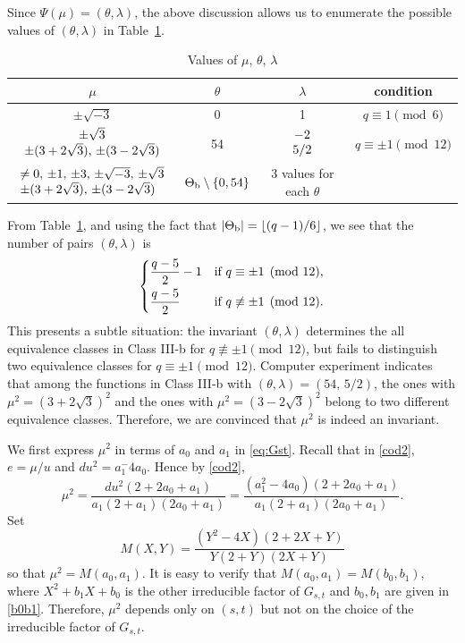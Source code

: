 \documentclass{amsart}
\numberwithin{equation}{section}
\theoremstyle{definition}
\begin{document}
Since $\Psi(\mu)=(\theta,\lambda)$, the above discussion allows us to enumerate the possible values of $(\theta,\lambda)$ in Table~\ref{tb:the-lam}.

\begin{table}[ht]
\caption{Values of $\mu$, $\theta$, $\lambda$}\label{tb:the-lam}
   \renewcommand*{\arraystretch}{1.4}
    \centering
     \begin{tabular}{c|c|c|c}
         \hline
         $\mu$ & $\theta$ & $\lambda$  & condition \\ \hline
         $\pm\sqrt{-3}$ & 0 & 1& $q\equiv 1\pmod 6$ \\ \hline
         $\begin{array}{c} \pm \sqrt3 \cr \pm(3+2\sqrt3),\, \pm(3-2\sqrt3)\end{array}$ & 54 & $\begin{array}{c} -2 \cr 5/2\end{array}$ & $q\equiv \pm1\pmod{12}$\\ \hline
         $\begin{array}{l} \ne0,\,\pm1,\,\pm3,\, \pm\sqrt{-3},\,\pm\sqrt 3\cr \pm(3+2\sqrt3),\, \pm(3-2\sqrt3)\end{array}$ & $\Theta_{\rm b}\setminus\{0,54\}$  &  3 values for each $\theta$  \\ \hline
     \end{tabular}
\end{table}

From Table~\ref{tb:the-lam}, and using the fact that $|\Theta_{\rm b}|=\lfloor(q-1)/6\rfloor$, we see that the number of pairs $(\theta,\lambda)$ is 
\[
\begin{cases}
\displaystyle\frac{q-5}2-1&\text{if}\ q\equiv\pm1\pmod{12},\vspace{0.4em}\cr
\displaystyle\frac{q-5}2&\text{if}\ q\not\equiv\pm1\pmod{12}.
\end{cases}
\]
This presents a subtle situation: the invariant $(\theta,\lambda)$ determines the all equivalence classes in Class III-b for $q\not\equiv\pm1\pmod{12}$, but fails to distinguish two equivalence classes for $q\equiv\pm1\pmod{12}$. Computer experiment indicates that among the functions in Class III-b with $(\theta,\lambda)=(54,\,5/2)$, the ones with $\mu^2=(3+2\sqrt3)^2$ and the ones with $\mu^2=(3-2\sqrt3)^2$ belong to two different equivalence classes. Therefore, we are convinced that $\mu^2$ is indeed an invariant.

We first express $\mu^2$ in terms of $a_0$ and $a_1$ in \eqref{eq:Gst}. Recall that in \eqref{cod2}, $e=\mu/u$ and $du^2=a_1^-4a_0$. Hence by \eqref{cod2},
\begin{equation}\label{mu2=}
\mu^2=\frac{du^2(2+2a_0+a_1)}{a_1(2+a_1)(2a_0+a_1)}=\frac{(a_1^2-4a_0)(2+2a_0+a_1)}{a_1(2+a_1)(2a_0+a_1)}.
\end{equation}
Set
\begin{equation}\label{eq:M}
M(X,Y)=\frac{(Y^2-4X)(2+2X+Y)}{Y(2+Y)(2X+Y)} 
\end{equation} 
so that $\mu^2=M(a_0,a_1)$. It is easy to verify that $M(a_0,a_1)=M(b_0,b_1)$, where $X^2+b_1X+b_0$ is the other irreducible factor of $G_{s,t}$ and $b_0,b_1$ are given in \eqref{b0b1}. Therefore, $\mu^2$ depends only on $(s,t)$ but not on the choice of the irreducible factor of $G_{s,t}$.
\end{document}
